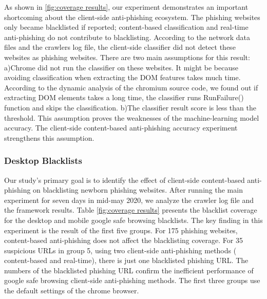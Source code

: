 As shown in \ref{fig:coverage results}, our experiment demonstrates an important shortcoming about the client-side anti-phishing ecosystem. The phishing websites only became blacklisted if reported; content-based classification and real-time anti-phishing do not contribute to blacklisting.
According to the network data files and the crawlers log file, the client-side classifier did not detect these websites as phishing websites. There are two main assumptions for this result:
a)Chrome did not run the classifier on these websites. It might be because avoiding classification when extracting the DOM features takes much time. According to the dynamic analysis of the chromium source code, we found out if extracting DOM elements takes a long time, the classifier runs RunFailure() function and skips the classification.
b)The classifier result score is less than the threshold. This assumption proves the weaknesses of the machine-learning model accuracy.  The client-side content-based anti-phishing accuracy experiment strengthens this assumption.

\subsubsection{Desktop Blacklists}
Our study's primary goal is to identify the effect of client-side content-based anti-phishing on blacklisting newborn phishing websites. After running the main experiment for seven days in mid-may 2020, we analyze the crawler log file and the framework results. Table \ref{fig:coverage results} presents the blacklist coverage for the desktop and mobile google safe browsing blacklists. The key finding in this experiment is the result of the first five groups. For 175 phishing websites, content-based anti-phishing does not affect the blacklisting coverage. For  35 suspicious URLs in group 5, using two client-side anti-phishing methods ( content-based and real-time), there is just one blacklisted phishing URL. The numbers of the blacklisted phishing URL confirm the inefficient performance of google safe browsing client-side anti-phishing methods. The first three groups use the default settings of the chrome browser. 

